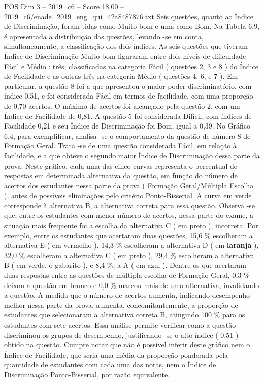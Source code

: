 \begin{textsample}{POS Dim 3 – 2019\_c6 – Score 18.00 – 2019\_c6/enade\_2019\_eng\_qui\_42a8487876.txt}
Seis questões, quanto ao Índice de Discriminação, foram tidas como Muito bom e uma como Bom.
Na Tabela 6.9, é apresentada a distribuição das questões, levando -se em conta, simultaneamente, a classificação dos dois índices.
As seis questões que tiveram Índice de Discriminação Muito bom figuraram entre dois níveis de dificuldade Fácil e Médio : três, classificadas na categoria Fácil ( questões 2, 3 e 8 ) do Índice de Facilidade e as outras três na categoria Médio ( questões 4, 6, e 7 ).
Em particular, a questão 8 foi a que apresentou o maior poder discriminatório, com índice 0,51, e foi considerada Fácil em termos de facilidade, com uma proporção de 0,70 acertos.
O máximo de acertos foi alcançado pela questão 2, com um Índice de Facilidade de 0,81.
A questão 5 foi considerada Difícil, com índices de Facilidade 0,21 e seu Índice de Discriminação foi Bom, igual a 0,39.
No Gráfico 6.4, para exemplificar, analisa -se o comportamento da questão de número 8 de Formação Geral.
Trata -se de uma questão considerada Fácil, em relação à facilidade, e a que obteve o segundo maior Índice de Discriminação dessa parte da prova.
Neste gráfico, cada uma das cinco curvas representa o percentual de respostas em determinada alternativa da questão, em função do número de acertos dos estudantes nessa parte da prova ( Formação Geral/Múltipla Escolha ), antes de possíveis eliminações pelo critério Ponto-Bisserial.
A curva em verde corresponde à alternativa B, a alternativa correta para essa questão.
Observa -se que, entre os estudantes com menor número de acertos, nessa parte do exame, a situação mais frequente foi a escolha da alternativa C ( em preto ), incorreta.
Por exemplo, entre os estudantes que acertaram duas questões, 15,6 \% escolheram a alternativa E ( em vermelho ), 14,3 \% escolheram a alternativa D ( em \textbf{laranja} ), 32,0 \% escolheram a alternativa C ( em preto ), 29,4 \% escolheram a alternativa B ( em verde, o gabarito ), e 8,4 \%, a A ( em azul ).
Dentre os que acertaram duas respostas entre as questões de múltipla escolha de Formação Geral, 0,3 \% deixou a questão em branco e 0,0 \% marcou mais de uma alternativa, invalidando a questão.
À medida que o número de acertos aumenta, indicando desempenho melhor nessa parte da prova, aumenta, concomitantemente, a proporção de estudantes que selecionaram a alternativa correta B, atingindo 100 \% para os estudantes com sete acertos.
Essa análise permite verificar como a questão discriminou os grupos de desempenho, justificando -se o alto índice ( 0,51 ) obtido na questão.
Cumpre notar que não é possível inferir deste gráfico nem o Índice de Facilidade, que seria uma média da proporção ponderada pela quantidade de estudantes com cada uma das notas, nem o Índice de Discriminação Ponto-Bisserial, por razão equivalente.

\end{textsample}
